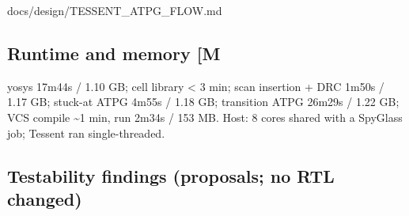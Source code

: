 \begin{relocated}{docs/design/TESSENT_ATPG_FLOW.md}
\subsection{\texorpdfstring{Runtime and memory {[}M
\code{reports/runtime.txt}{]}}{Runtime and memory {[}M {]}}}\label{tm:flow:tessent-atpg:6-runtime-and-memory-m-reportsruntimetxt}

yosys 17m44s / 1.10 GB; cell library \textless{} 3 min; scan insertion +
DRC 1m50s / 1.17 GB; stuck-at ATPG 4m55s / 1.18 GB; transition ATPG
26m29s / 1.22 GB; VCS compile \textasciitilde1 min, run 2m34s / 153 MB.
Host: 8 cores shared with a SpyGlass job; Tessent ran single-threaded.

\subsection{Testability findings (proposals; no RTL changed)}\label{tm:flow:tessent-atpg:7-testability-findings-proposals-no-rtl-changed}

{\footnotesize\setlength{\tabcolsep}{3pt}

}
\end{relocated}
